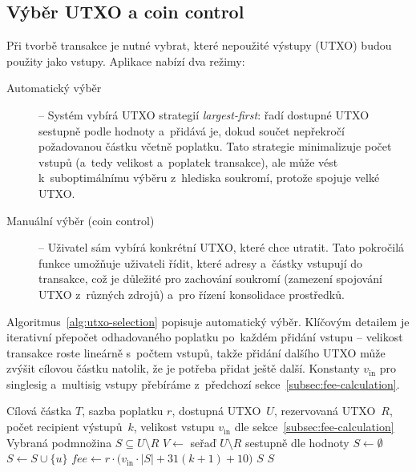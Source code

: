 \subsection{Výběr UTXO a coin control}
\label{subsec:coin-control}

Při tvorbě transakce je nutné vybrat, které nepoužité výstupy (UTXO) budou
použity jako vstupy. Aplikace nabízí dva režimy:

\begin{description}
\item[Automatický výběr] -- Systém vybírá UTXO strategií \emph{largest-first}:
  řadí dostupné UTXO sestupně podle hodnoty a~přidává je, dokud součet
  nepřekročí požadovanou částku včetně poplatku. Tato strategie minimalizuje
  počet vstupů (a~tedy velikost a~poplatek transakce), ale může vést
  k~suboptimálnímu výběru z~hlediska soukromí, protože spojuje velké UTXO.

\item[Manuální výběr (coin control)] -- Uživatel sám vybírá konkrétní UTXO,
  které chce utratit. Tato pokročilá funkce umožňuje uživateli řídit, které
  adresy a~částky vstupují do transakce, což je důležité pro zachování
  soukromí (zamezení spojování UTXO z~různých zdrojů) a~pro řízení
  konsolidace prostředků.
\end{description}

Algoritmus~\ref{alg:utxo-selection} popisuje automatický výběr.
Klíčovým detailem je iterativní přepočet odhadovaného poplatku po~každém
přidání vstupu -- velikost transakce roste lineárně s~počtem vstupů,
takže přidání dalšího UTXO může zvýšit cílovou částku natolik, že je
potřeba přidat ještě další. Konstanty $v_{\text{in}}$ pro singlesig
a~multisig vstupy přebíráme z~předchozí
sekce~\ref{subsec:fee-calculation}.

\begin{algorithm}[htbp]
\caption{Automatický výběr UTXO strategií \emph{largest-first}}
\label{alg:utxo-selection}
\begin{algorithmic}[1]
\Require Cílová částka $T$, sazba poplatku $r$, dostupná
        UTXO~$U$, rezervovaná UTXO~$R$, počet recipient výstupů~$k$,
        velikost vstupu $v_{\text{in}}$ dle sekce~\ref{subsec:fee-calculation}
\Ensure Vybraná podmnožina $S \subseteq U \setminus R$
\State $V \gets$ seřaď $U \setminus R$ sestupně dle hodnoty
\State $S \gets \emptyset$
  \State $S \gets S \cup \{u\}$
  \State $\mathit{fee} \gets r \cdot \bigl(v_{\text{in}} \cdot |S| + 31(k{+}1) + 10\bigr)$
    \State \Return $S$
  \EndIf
\EndFor
\State \Return $S$
\end{algorithmic}
\end{algorithm}

